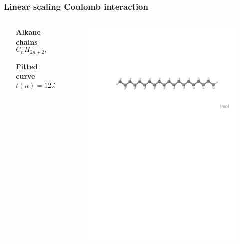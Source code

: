 \begin{frame}
    \frametitle{Linear scaling Coulomb interaction}
    \scriptsize
    \begin{columns}
    \begin{column}{.10\textwidth}
    \ \\
    \end{column}
    \begin{column}{.40\textwidth}
	\centering

        \vspace{2mm}
	
        \textbf{Alkane chains}
	\begin{equation}
	    \nonumber
	    C_{n}H_{2n+2}, \qquad n=2,\dots,70
	\end{equation}

        \vspace{4mm}
	
        \textbf{Fitted curve}
	\begin{equation}
	    \nonumber
	    t(n) = 12.5 + 2.34n^{0.754} 
	\end{equation}
    \end{column}
    \begin{column}{.60\textwidth}
	\centering

        \vspace{3mm}

	\begin{figure}
	    \includegraphics[scale=0.3, clip, viewport = 60 570 600 670]{figures/alkane.pdf}
	\end{figure}


\end{column}
\end{columns}
\end{frame}
